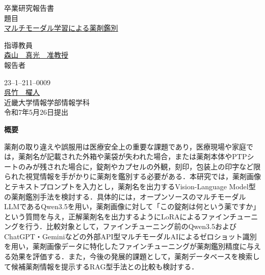 \documentclass{jsarticle}
\begin{document}
\pagestyle{empty}

\begin{center}
\vspace*{1cm}
\large
{\LARGE 卒業研究報告書}\\
\vspace*{0.8cm}
題目\\
\vspace*{1cm}
{\Huge \underline{マルチモーダル学習による薬剤鑑別}}\\
\vspace{3mm}

\vspace*{3cm}
指導教員\\
\vspace*{0.3cm}
\underline{\LARGE 森山　真光　准教授}\\
\vspace*{3cm}
報告者\\
\vspace*{0.3cm}

{23--1--211--0009}\\
\vspace*{0.3cm}
\underline{\Huge 呉竹　櫂人}\\
\vspace*{0.5cm}
近畿大学情報学部情報学科\\
\vspace*{2cm}
令和7年5月26日提出\\
\end{center}

\newpage
\normalsize

\clearpage
\begin{center}
{\bf \Large 概要}
\end{center}

薬剤の取り違えや誤服用は医療安全上の重要な課題であり，医療現場や家庭では，薬剤名が記載された外箱や薬袋が失われた場合，または薬剤本体やPTPシートのみが残された場合に，錠剤やカプセルの外観，刻印，包装上の印字など限られた視覚情報を手がかりに薬剤を鑑別する必要がある．本研究では，薬剤画像とテキストプロンプトを入力とし，薬剤名を出力するVision-Language Model型の薬剤鑑別手法を検討する．具体的には，オープンソースのマルチモーダルLLMであるQwen3.5を用い，薬剤画像に対して「この錠剤は何という薬ですか」という質問を与え，正解薬剤名を出力するようにLoRAによるファインチューニングを行う．比較対象として，ファインチューニング前のQwen3.5およびChatGPT・Geminiなどの外部API型マルチモーダルAIによるゼロショット識別を用い，薬剤画像データに特化したファインチューニングが薬剤鑑別精度に与える効果を評価する．また，今後の発展的課題として，薬剤データベースを検索して候補薬剤情報を提示するRAG型手法との比較も検討する．
\end{document}
